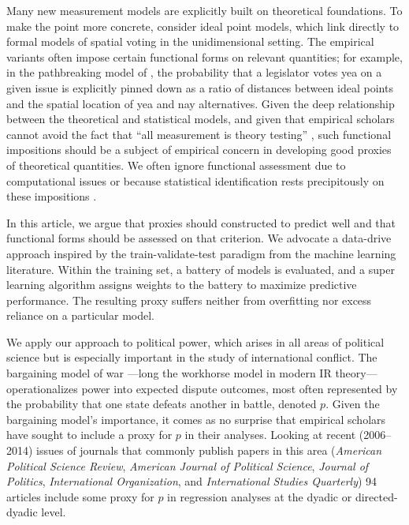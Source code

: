 Many new measurement models are explicitly built on theoretical foundations. 
To make the point more concrete, consider ideal point models, which link directly to formal models of spatial voting in the unidimensional setting. 
The empirical variants often impose certain functional forms on relevant quantities; for example, in the pathbreaking model of \citet{poole1985}, the probability that a legislator votes yea on a given issue is explicitly pinned down as a ratio of distances between ideal points and the spatial location of yea and nay alternatives. 
Given the deep relationship between the theoretical and statistical models, and given that empirical scholars cannot avoid the fact that ``all measurement is theory testing'' \citep[272]{jacoby1999}, such functional impositions should be a subject of empirical concern in developing good proxies of theoretical quantities. 
We often ignore functional assessment due to computational issues or because statistical identification rests precipitously on these impositions \citep{poole1991}.

In this article, we argue that proxies should constructed to predict well and that functional forms should be assessed on that criterion. 
We advocate a data-drive approach inspired by the train-validate-test paradigm from the machine learning literature. 
Within the training set, a battery of models is evaluated, and a super learning algorithm assigns weights to the battery to maximize predictive performance. 
The resulting proxy suffers neither from overfitting nor excess reliance on a particular model.

We apply our approach to political power, which arises in all areas of political science but is especially important in the study of international conflict. 
The bargaining model of war \citep{fearon1995}---long the workhorse model in modern IR theory---operationalizes power into expected dispute outcomes, most often represented by the probability that one state defeats another in battle, denoted $p$. 
Given the bargaining model's importance, it comes as no surprise that empirical scholars have sought to include a proxy for $p$ in their analyses. 
Looking at recent (2006--2014) issues of journals that commonly publish papers in this area (\emph{American Political Science Review}, \emph{American Journal of Political Science}, \emph{Journal of Politics}, \emph{International Organization}, and \emph{International Studies Quarterly}) 94 articles include some proxy for $p$ in regression analyses at the dyadic or directed-dyadic level.

